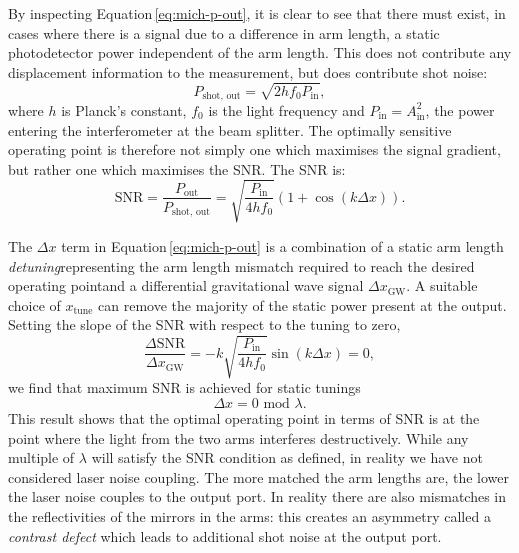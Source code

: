 By inspecting Equation\,\ref{eq:mich-p-out}, it is clear to see that there must exist, in cases where there is a signal due to a difference in arm length, a static photodetector power independent of the arm length. This does not contribute any displacement information to the measurement, but does contribute shot noise:
\begin{equation}
  P_{\text{shot, out}} = \sqrt{2 h f_0 P_{\text{in}}},
\end{equation}
where $h$ is Planck's constant, $f_0$ is the light frequency and $P_{\text{in}} = A_{\text{in}}^2$, the power entering the interferometer at the beam splitter. The optimally sensitive operating point is therefore not simply one which maximises the signal gradient, but rather one which maximises the SNR. The SNR is:
\begin{equation}
  \text{SNR} = \frac{P_{\text{out}}}{P_{\text{shot, out}}} = \sqrt{\frac{P_{\text{in}}}{4 h f_0}} \left( 1 + \cos \left(k \Delta x \right) \right).
\end{equation}

The $\Delta x$ term in Equation\,\ref{eq:mich-p-out} is a combination of a static arm length \emph{detuning}\textemdash representing the arm length mismatch required to reach the desired operating point\textemdash and a differential gravitational wave signal $\Delta x_{\text{GW}}$. A suitable choice of $ x_{\text{tune}}$ can remove the majority of the static power present at the output. Setting the slope of the SNR with respect to the tuning to zero,
\begin{equation}
  \frac{\Delta \text{SNR}}{\Delta x_{\text{GW}}} = -k \sqrt{\frac{P_{\text{in}}}{4 h f_0}} \sin \left(k \Delta x\right) = 0,
\end{equation}
we find that maximum SNR is achieved for static tunings 
\begin{equation}
  \Delta x = 0 \text{ mod } \lambda.
\end{equation}
This result shows that the optimal operating point in terms of SNR is at the point where the light from the two arms interferes destructively. While any multiple of $\lambda$ will satisfy the SNR condition as defined, in reality we have not considered laser noise coupling. The more matched the arm lengths are, the lower the laser noise couples to the output port. In reality there are also mismatches in the reflectivities of the mirrors in the arms: this creates an asymmetry called a \emph{contrast defect} which leads to additional shot noise at the output port.

